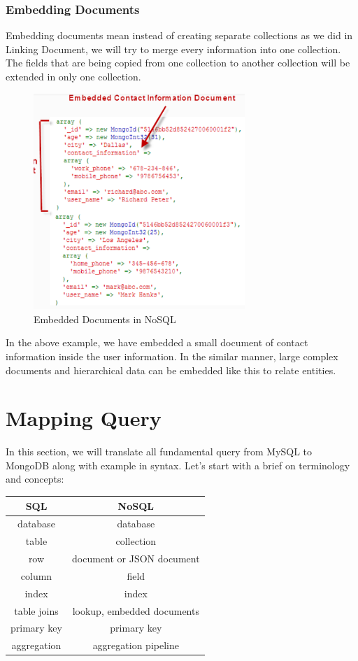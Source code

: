 \documentclass[conference]{IEEEtran}
\begin{document}
\subsubsection{Embedding Documents}
Embedding documents mean instead of creating separate collections as we did in Linking Document, we will try to merge every information into one collection. The fields that are being copied from one collection to another collection will be extended in only one collection.
\begin{figure}[H]
    \centering
    \includegraphics[width=8cm]{embeddeddocuments}
    \caption{Embedded Documents  in NoSQL}
    \label{fig:fig4}
\end{figure}
In the above example, we have embedded a small document of contact information inside the user information. In the similar manner, large complex documents and hierarchical data can be embedded like this to relate entities.
\section{Mapping Query}
In this section, we will translate all fundamental query from MySQL to MongoDB along with example in syntax.
Let's start with a brief on terminology and concepts:
\begin{center}
 \begin{tabular}{||c c||} 
 \hline
   SQL & NoSQL  \\ [0.5ex] 
 \hline\hline
 database & database  \\ 
 \hline
 table & 	collection   \\
 \hline
 row & document or JSON document \\
  \hline
 column & 		field   \\
  \hline
 index & 		index   \\
  \hline
 table joins & 	lookup, embedded documents   \\
  \hline
 primary key & 	 primary key   \\
   \hline
 aggregation  & aggregation pipeline   \\
 [1ex] 
 \hline
\end{tabular}
\end{center}
\end{document}

